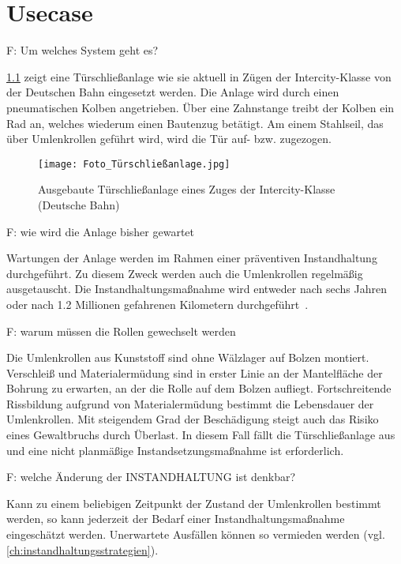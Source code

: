 \chapter{Usecase}
\label{ch:usecase}
F: Um welches System geht es?

\cref{fig:foto_tureschliessanlage} zeigt eine Türschließanlage wie sie aktuell in Zügen der Intercity-Klasse von der Deutschen Bahn eingesetzt werden. Die Anlage wird durch einen pneumatischen Kolben angetrieben. Über eine Zahnstange treibt der Kolben ein Rad an, welches wiederum einen Bautenzug betätigt. Am einem Stahlseil, das über Umlenkrollen geführt wird, wird die Tür auf- bzw. zugezogen.

\begin{figure}[ht]
	\centering
	\texttt{[image: Foto\_Türschließanlage.jpg]}
	\caption{Ausgebaute Türschließanlage eines Zuges der Intercity-Klasse (Deutsche Bahn)}
	\label{fig:foto_tureschliessanlage}
\end{figure}

F: wie wird die Anlage bisher gewartet

Wartungen der Anlage werden im Rahmen einer präventiven Instandhaltung durchgeführt. Zu diesem Zweck werden auch die Umlenkrollen regelmäßig ausgetauscht. Die Instandhaltungsmaßnahme wird entweder nach sechs Jahren oder nach \num{1.2} Millionen gefahrenen Kilometern durchgeführt~\cite{db.27.01.2021}.

F: warum müssen die Rollen gewechselt werden

Die Umlenkrollen aus Kunststoff  sind ohne Wälzlager auf Bolzen montiert. Verschleiß und Materialermüdung sind in erster Linie an der Mantelfläche der Bohrung zu erwarten, an der die Rolle auf dem Bolzen aufliegt. Fortschreitende Rissbildung aufgrund von Materialermüdung bestimmt die Lebensdauer der Umlenkrollen. Mit steigendem Grad der Beschädigung steigt auch das Risiko eines Gewaltbruchs durch Überlast. In diesem Fall fällt die Türschließanlage aus und eine nicht planmäßige Instandsetzungsmaßnahme ist erforderlich.

F: welche Änderung der INSTANDHALTUNG ist denkbar?

Kann zu einem beliebigen Zeitpunkt der Zustand der Umlenkrollen bestimmt werden, so kann jederzeit der Bedarf einer Instandhaltungsmaßnahme eingeschätzt werden. Unerwartete Ausfällen können so vermieden werden (vgl. \cref{ch:instandhaltungsstrategien}). 

